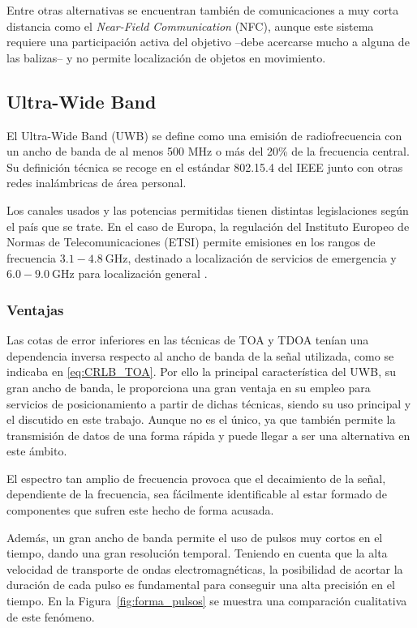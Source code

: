 Entre otras alternativas se encuentran también de comunicaciones a muy corta distancia como el \textit{Near-Field Communication} (NFC), aunque este sistema requiere una participación activa del objetivo --debe acercarse mucho a alguna de las balizas-- y no permite localización de objetos en movimiento.

\subsection{Ultra-Wide Band}

El Ultra-Wide Band (UWB) se define como una emisión de radiofrecuencia con un ancho de banda de al menos 500 MHz o más del 20\% de la frecuencia central.
Su definición técnica se recoge en el estándar 802.15.4 del IEEE junto con otras redes inalámbricas de área personal.

Los canales usados y las potencias permitidas tienen distintas legislaciones según el país que se trate.
En el caso de Europa, la regulación del Instituto Europeo de Normas de Telecomunicaciones (ETSI) permite emisiones en los rangos de frecuencia $3.1 - 4.8~\si{\giga\hertz}$, destinado a localización de servicios de emergencia y  $6.0 - 9.0~\si{\giga\hertz}$ para localización general \cite{UWB_regs}.

\subsubsection{Ventajas}

Las cotas de error inferiores en las técnicas de TOA y TDOA tenían una dependencia inversa respecto al ancho de banda de la señal utilizada, como se indicaba en \eqref{eq:CRLB_TOA}.
Por ello la principal característica del UWB, su gran ancho de banda, le proporciona una gran ventaja en su empleo para servicios de posicionamiento a partir de dichas técnicas, siendo su uso principal y el discutido en este trabajo.
Aunque no es el único, ya que también permite la transmisión de datos de una forma rápida y puede llegar a ser una alternativa en este ámbito.

El espectro tan amplio de frecuencia provoca que el decaimiento de la señal, dependiente de la frecuencia, sea fácilmente identificable al estar formado de componentes que sufren este hecho de forma acusada.

Además, un gran ancho de banda permite el uso de pulsos muy cortos en el tiempo, dando una gran resolución temporal.
Teniendo en cuenta que la alta velocidad de transporte de ondas electromagnéticas, la posibilidad de acortar la duración de cada pulso es fundamental para conseguir una alta precisión en el tiempo.
En la Figura~\ref{fig:forma_pulsos} se muestra una comparación cualitativa de este fenómeno.

